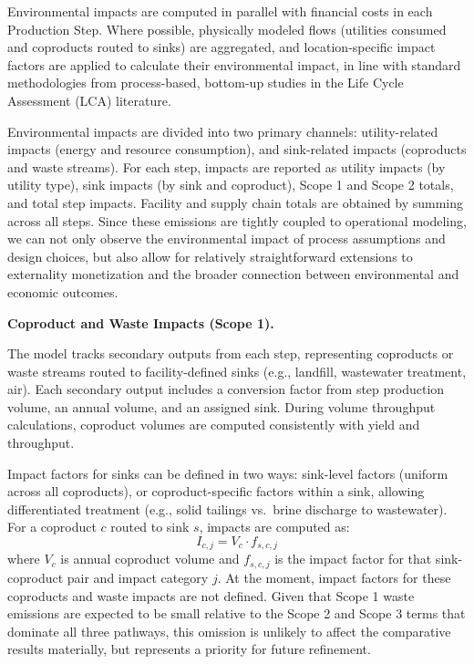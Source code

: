 Environmental impacts are computed in parallel with financial costs in each Production Step. Where possible, physically modeled flows (utilities consumed and coproducts routed to sinks) are aggregated, and location-specific impact factors are applied to calculate their environmental impact, in line with standard methodologies from process-based, bottom-up studies in the Life Cycle Assessment (LCA) literature.

Environmental impacts are divided into two primary channels: utility-related impacts (energy and resource consumption), and sink-related impacts (coproducts and waste streams). For each step, impacts are reported as utility impacts (by utility type), sink impacts (by sink and coproduct), Scope 1 and Scope 2 totals, and total step impacts. Facility and supply chain totals are obtained by summing across all steps. Since these emissions are tightly coupled to operational modeling, we can not only observe the environmental impact of process assumptions and design choices, but also allow for relatively straightforward extensions to externality monetization and the broader connection between environmental and economic outcomes.


\medskip
\noindent\textbf{Coproduct and Waste Impacts (Scope 1).}\quad

The model tracks secondary outputs from each step, representing coproducts or waste streams routed to facility-defined sinks (e.g., landfill, wastewater treatment, air). Each secondary output includes a conversion factor from step production volume, an annual volume, and an assigned sink. During volume throughput calculations, coproduct volumes are computed consistently with yield and throughput.

Impact factors for sinks can be defined in two ways: sink-level factors (uniform across all coproducts), or coproduct-specific factors within a sink, allowing differentiated treatment (e.g., solid tailings vs.\ brine discharge to wastewater). For a coproduct $c$ routed to sink $s$, impacts are computed as:
\begin{equation}
    I_{c,j} = V_c \cdot f_{s,c,j}
\end{equation}
where $V_c$ is annual coproduct volume and $f_{s,c,j}$ is the impact factor for that sink-coproduct pair and impact category $j$. At the moment, impact factors for these coproducts and waste impacts are not defined. Given that Scope 1 waste emissions are expected to be small relative to the Scope 2 and Scope 3 terms that dominate all three pathways, this omission is unlikely to affect the comparative results materially, but represents a priority for future refinement. 

